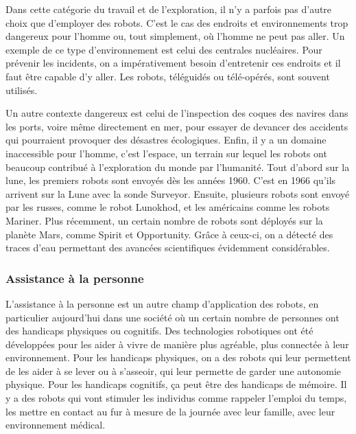Dans cette catégorie du travail et de l'exploration, il n'y a parfois pas d'autre choix que d'employer des robots. C'est le cas des endroits et environnements trop dangereux pour l'homme ou, tout simplement, où l'homme ne peut pas aller. 
Un exemple de ce type d'environnement est celui des centrales nucléaires. Pour prévenir les incidents, on a impérativement besoin d'entretenir ces endroits et il faut être capable d'y aller. Les robots, téléguidés ou télé-opérés, sont souvent utilisés. 

Un autre contexte dangereux est celui de l'inspection des coques des navires dans les ports, voire même directement en mer, pour essayer de devancer des accidents qui pourraient provoquer des désas\-tres écologiques. Enfin, il y a un domaine inaccessible pour l'homme, c'est l'espace, un terrain sur lequel les robots ont beaucoup contribué à l'exploration du monde par l'humanité. Tout d'abord sur la lune, les premiers robots sont envoyés dès les années 1960. C'est en 1966 qu'ils arrivent sur la Lune avec la sonde Surveyor. Ensuite, plusieurs robots sont envoyé par les russes, comme le robot Lunokhod, et les américains comme les robots Mariner. Plus récemment, un certain nombre de robots sont déployés sur la planète Mars, comme Spirit et Opportunity. Grâce à ceux-ci, on a détecté des traces d'eau permettant des avancées scientifiques évidemment considérables. 

\subsubsection[Assistance à la personne]{Assistance à la personne}
\label{subsub:III.2.2.2}

L'assistance à la personne est un autre champ d'application des robots, en particulier aujourd'hui dans une société où un certain nombre de personnes ont des handicaps physiques ou cognitifs.
Des technologies robotiques ont été développées pour les aider à vivre de manière plus agréable, plus connectée à leur environnement. 
Pour les handicaps physiques, on a des robots qui leur permettent de les aider à se lever ou à s'asseoir, qui leur permette de garder une autonomie physique. 
Pour les handicaps cognitifs, ça peut être des handicaps de mémoire. Il y a des robots qui vont stimuler les individus comme rappeler l'emploi du temps, les mettre en contact au fur à mesure de la journée avec leur famille, avec leur environnement médical. 

